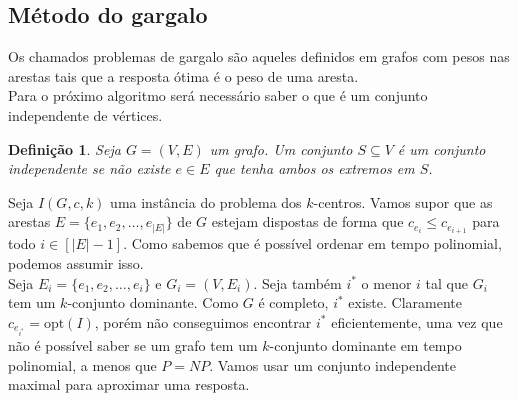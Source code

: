 \documentclass[12pt]{article}
\newcommand{\opt}{\ensuremath{\mathrm{opt}}}
\newtheorem{definition}[theorem]{Definição}
\newcommand{\NP}{\mathit{NP}}
\begin{document}
\subsection{Método do gargalo}
Os chamados problemas de gargalo são aqueles definidos em grafos com pesos nas arestas tais que a resposta ótima é o peso de uma aresta. \\
Para o próximo algoritmo será necessário saber o que é um conjunto independente de vértices.
\begin{definition}
    Seja $G = (V,E)$ um grafo. Um conjunto $S \subseteq V$ é um conjunto \emph{independente} se não existe $e \in E$ que tenha ambos os extremos em $S$.
\end{definition}
Seja $I(G,c,k)$ uma instância do problema dos $k$-centros. Vamos supor que as arestas $E = \{e_1,e_2,\ldots,e_{|E|}\}$ de $G$ estejam dispostas de forma que $c_{e_i} \leq c_{e_{i+1}}$ para todo $i \in [|E|-1]$. Como sabemos que é possível ordenar em tempo polinomial, podemos assumir isso. \\
Seja $E_i = \{e_1,e_2,\ldots,e_i\}$ e $G_i = (V,E_i)$. Seja também $i^*$ o menor $i$ tal que $G_i$ tem um $k$-conjunto dominante. Como $G$ é completo, $i^*$ existe. Claramente $c_{e_{i^*}} = \opt(I)$, porém não conseguimos encontrar $i^*$ eficientemente, uma vez que não é possível saber se um grafo tem um $k$-conjunto dominante em tempo polinomial, a menos que $P = \NP$. Vamos usar um conjunto independente maximal para aproximar uma resposta.
\end{document}
